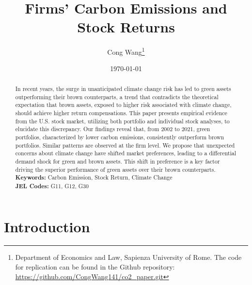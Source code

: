 \documentclass[12pt]{article}
\begin{document}
\begin{titlepage}
\title{Firms' Carbon Emissions and Stock Returns}
\author{ Cong Wang\thanks{Department of Economics and Law, Sapienza University of Rome. The code for replication can be found in the Github repository: \url{https://github.com/CongWang141/co2_paper.git}}}
\date{\today}
\maketitle
\begin{abstract}
\noindent In recent years, the surge in unanticipated climate change risk has led to green assets outperforming their brown counterparts, a trend that contradicts the theoretical expectation that brown assets, exposed to higher risk associated with climate change, should achieve higher return compensations. This paper presents empirical evidence from the U.S. stock market, utilizing both portfolio and individual stock analyses, to elucidate this discrepancy. Our findings reveal that, from 2002 to 2021, green portfolios, characterized by lower carbon emissions, consistently outperform brown portfolios. Similar patterns are observed at the firm level. We propose that unexpected concerns about climate change have shifted market preferences, leading to a differential demand shock for green and brown assets. This shift in preference is a key factor driving the superior performance of green assets over their brown counterparts.\\

\noindent\textbf{Keywords:} Carbon Emission, Stock Return, Climate Change\\

\noindent\textbf{JEL Codes:} G11, G12, G30\\
\bigskip
\end{abstract}
\setcounter{page}{0}
\thispagestyle{empty}
\end{titlepage}
\pagebreak \newpage

\doublespacing

\section{Introduction} \label{sec:introduction}
\end{document}
